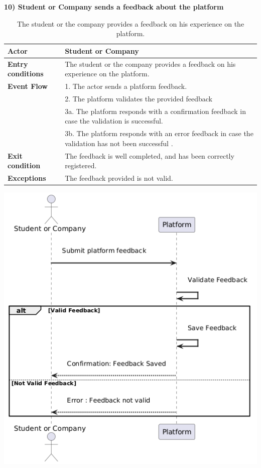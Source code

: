 \textbf{10) Student or Company sends a feedback about the platform} \\

\begin{table}[h!]
    \centering
    \begin{tabular}{lp{10cm}}
        \textbf{Actor} & Student or Company \\ \hline
        \textbf{Entry conditions} & The student or the company provides a feedback on his experience on the platform.\\ \hline
        \textbf{Event Flow} &
        1. The actor sends a platform feedback. \\
        & 2. The platform validates the provided feedback \\
        & 3a. The platform responds with a confirmation feedback in case the validation is successful. \\
        & 3b. The platform responds with an error feedback in case the validation has not been successful . \\
        \hline \textbf{Exit condition} & The feedback is well completed, and has been correctly registered.\\
        \hline \textbf{Exceptions} & The feedback provided is not valid. \\ \end{tabular}
    \caption{The student or the company provides a feedback on his experience on the platform.}
    \label{tab:company_manage_internship_applications}
\end{table}

\begin{center}
    \includegraphics[scale = 0.8]{Images/ImagesRASD/StudentAndCompanySendPlatformFeedback.png}
\end{center}
\newpage

